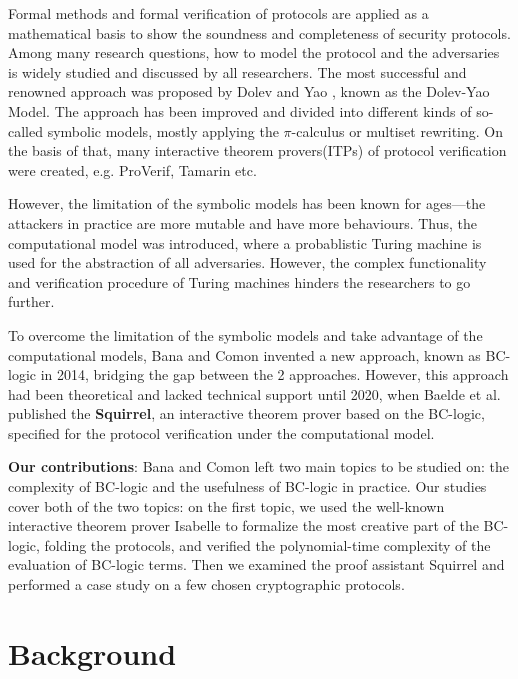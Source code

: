\documentclass[conference]{IEEEtran}
\begin{document}
 Formal methods and formal verification of protocols are applied as a mathematical basis to show the soundness and completeness of security protocols. Among many research questions, how to model the protocol and the adversaries is widely studied and discussed by all researchers. The most successful and renowned approach was proposed by Dolev and Yao \cite{Dolev-Yao}, known as the Dolev-Yao Model. The approach has been improved and divided into different kinds of so-called symbolic models, mostly applying the $\pi$-calculus or multiset rewriting\cite{pi-calculus}. On the basis of that, many interactive theorem provers(ITPs) of protocol verification were created, e.g. ProVerif\cite{ProVerif}, Tamarin\cite{Tamarin} etc.

However, the limitation of the symbolic models has been known for ages---the attackers in practice are more mutable and have more behaviours. Thus, the computational model was introduced, where a probablistic Turing machine is used for the abstraction of all adversaries. However, the complex functionality and verification procedure of Turing machines hinders the researchers to go further. 

To overcome the limitation of the symbolic models and take advantage of the computational models, Bana and Comon invented a new approach, known as BC-logic in 2014, bridging the gap between the 2 approaches.\cite{BC-logic} However, this approach had been theoretical and lacked technical support until 2020, when Baelde et al.\cite{Squirrel} published the \textbf{Squirrel}, an interactive theorem prover based on the BC-logic, specified for the protocol verification under the computational model.

\textbf{Our contributions}: Bana and Comon left two main topics to be studied on: the complexity of BC-logic and the usefulness of BC-logic in practice. Our studies cover both of the two topics: on the first topic, we used the well-known interactive theorem prover Isabelle to formalize the most creative part of the BC-logic, folding the 
 protocols, and verified the polynomial-time complexity of the evaluation of BC-logic terms. Then we examined the proof assistant Squirrel and performed a case study on a few chosen cryptographic protocols.

\section{Background}
\end{document}
